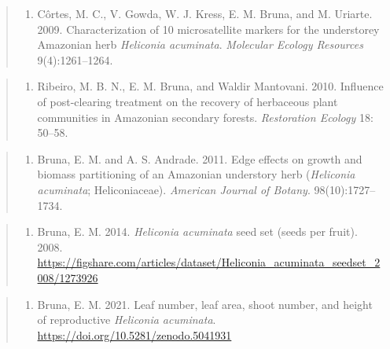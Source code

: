\documentclass[
  12pt,
  man, donotrepeattitle,floatsintext]{apa6}
\providecommand{\tightlist}{%
  \setlength{\itemsep}{0pt}\setlength{\parskip}{0pt}}
\begin{document}
\begin{quote}
\begin{enumerate}
\def\labelenumi{\arabic{enumi}.}
\setcounter{enumi}{4}
\tightlist
\item
  Côrtes, M. C., V. Gowda, W. J. Kress, E. M. Bruna, and M. Uriarte. 2009. Characterization of 10 microsatellite markers for the understorey Amazonian herb \emph{Heliconia acuminata}. \emph{Molecular Ecology Resources} 9(4):1261--1264.
\end{enumerate}
\end{quote}

\begin{quote}
\begin{enumerate}
\def\labelenumi{\arabic{enumi}.}
\setcounter{enumi}{5}
\tightlist
\item
  Ribeiro, M. B. N., E. M. Bruna, and Waldir Mantovani. 2010. Influence of post-clearing treatment on the recovery of herbaceous plant communities in Amazonian secondary forests. \emph{Restoration Ecology} 18: 50--58.
\end{enumerate}
\end{quote}

\begin{quote}
\begin{enumerate}
\def\labelenumi{\arabic{enumi}.}
\setcounter{enumi}{6}
\tightlist
\item
  Bruna, E. M. and A. S. Andrade. 2011. Edge effects on growth and biomass partitioning of an Amazonian understory herb (\emph{Heliconia acuminata}; Heliconiaceae). \emph{American Journal of Botany}. 98(10):1727--1734.
\end{enumerate}
\end{quote}

\begin{quote}
\begin{enumerate}
\def\labelenumi{\arabic{enumi}.}
\setcounter{enumi}{7}
\tightlist
\item
  Bruna, E. M. 2014. \emph{Heliconia acuminata} seed set (seeds per fruit). 2008. \url{https://figshare.com/articles/dataset/Heliconia_acuminata_seedset_2008/1273926}
\end{enumerate}
\end{quote}

\begin{quote}
\begin{enumerate}
\def\labelenumi{\arabic{enumi}.}
\setcounter{enumi}{8}
\tightlist
\item
  Bruna, E. M. 2021. Leaf number, leaf area, shoot number, and height of reproductive \emph{Heliconia acuminata}. \url{https://doi.org/10.5281/zenodo.5041931}
\end{enumerate}
\end{quote}
\end{document}
